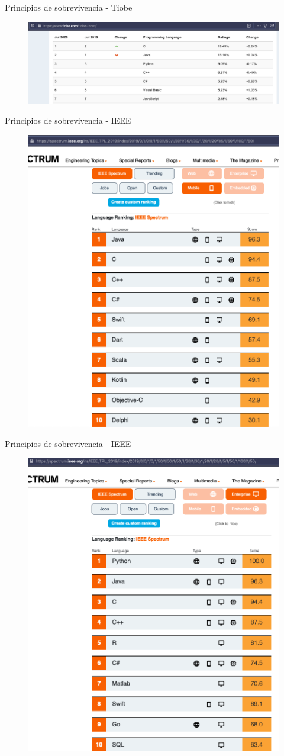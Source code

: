 \documentclass[aspectratio=169]{beamer}
\begin{document}
\begin{frame}{Principios de sobrevivencia - Tiobe}
	\begin{figure}
		\centering
		\includegraphics[width=0.9\linewidth]{Images/tiobe}
	\end{figure}
\end{frame}

\begin{frame}{Principios de sobrevivencia - IEEE}
    \begin{figure}
        \centering
        \includegraphics[width=0.5\linewidth]{Images/ieeemobile}
    \end{figure}
\end{frame}

\begin{frame}{Principios de sobrevivencia - IEEE}
    \begin{figure}
        \centering
        \includegraphics[width=0.5\linewidth]{Images/ieeeenterpise}
    \end{figure}
\end{frame}
\end{document}
